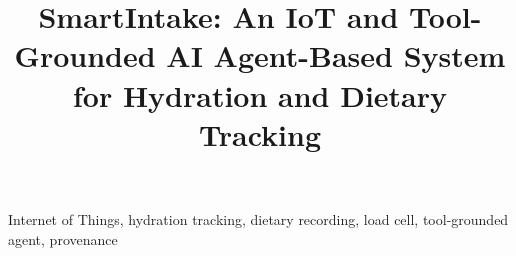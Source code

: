 \documentclass[conference]{IEEEtran}
\begin{document}
\title{SmartIntake: An IoT and Tool-Grounded AI Agent-Based System for Hydration and Dietary Tracking}
\author{
}
\maketitle

\begin{IEEEkeywords}Internet of Things, hydration tracking, dietary recording, load cell, tool-grounded agent, provenance\end{IEEEkeywords}







\balance


\end{document}
